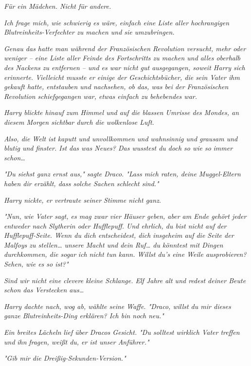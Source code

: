 {\emph{Für ein Mädchen. Nicht für andere.}

\emph{\emph{Ich frage mich, wie schwierig es wäre, einfach eine Liste aller hochrangigen Blutreinheits-Verfechter zu machen und sie umzubringen.}}

\emph{Genau das hatte man während der Französischen Revolution versucht, mehr oder weniger -- eine Liste aller Feinde des Fortschritts zu machen und alles oberhalb des Nackens zu entfernen -- und es war nicht gut ausgegangen, soweit Harry sich erinnerte. Vielleicht musste er einige der Geschichtsbücher, die sein Vater ihm gekauft hatte, entstauben und nachsehen, ob das, was bei der Französischen Revolution schiefgegangen war, etwas einfach zu behebendes war.}

\emph{Harry blickte hinauf zum Himmel und auf die blassen Umrisse des Mondes, an diesem Morgen sichtbar durch die wolkenlose Luft.}

\emph{\emph{Also, die Welt ist kaputt und unvollkommen und wahnsinnig und grausam und blutig und finster. Ist das was Neues? Das wusstest du doch so wie so}} \emph{\emph{immer schon…}}

\emph{"Du siehst ganz ernst aus," sagte Draco. "Lass mich raten, deine Muggel-Eltern haben dir erzählt, dass solche Sachen schlecht sind."}

\emph{Harry nickte, er vertraute seiner Stimme nicht ganz.}

\emph{"Nun, wie Vater sagt, es mag zwar vier Häuser geben, aber am Ende gehört jeder entweder nach Slytherin oder Hufflepuff. Und ehrlich, du bist nicht auf der Hufflepuff-Seite. Wenn du dich entscheidest, dich insgeheim auf die Seite der Malfoys zu stellen… unsere Macht und dein Ruf… du könntest mit Dingen durchkommen, die sogar} \emph{\emph{ich}} \emph{nicht tun kann. Willst du's eine Weile ausprobieren? Sehen, wie es so ist?"}

\emph{\emph{Sind wir nicht eine clevere kleine Schlange. Elf Jahre alt und redest deiner Beute schon das Verstecken aus…}}

\emph{Harry dachte nach, wog ab, wählte seine Waffe. "Draco, willst du mir dieses ganze Blutreinheits-Ding erklären? Ich bin noch neu."}

\emph{Ein breites Lächeln lief über Dracos Gesicht. "Du solltest wirklich Vater treffen und} \emph{\emph{ihn}} \emph{fragen, weißt du, er ist unser Anführer."}

\emph{"Gib mir die Dreißig-Sekunden-Version."}

}
